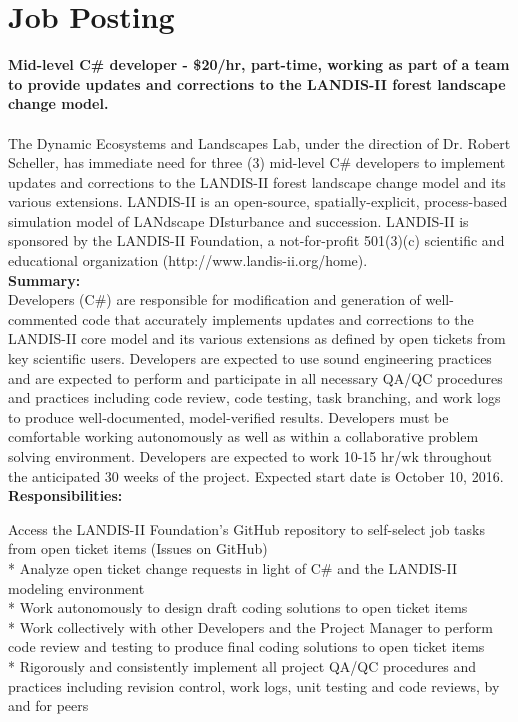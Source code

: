 \documentclass[letterpaper, 12pt]{article}
\newenvironment{myindentpar}[1]%
   {\begin{list}{}%
       {\setlength{\leftmargin}{#1}}%
           \item[]%
   }
     {\end{list}}
\begin{document}
\section{Job Posting}
\vspace*{1cm}
\textbf{Mid-level C\# developer - \$20/hr, part-time, working as part of a team to provide updates and corrections to the LANDIS-II forest landscape change model.} \\
\\
The Dynamic Ecosystems and Landscapes Lab, under the direction of Dr. Robert Scheller, has immediate need for three (3) mid-level C\# developers to implement updates and corrections to the LANDIS-II forest landscape change model and its various extensions. LANDIS-II is an open-source, spatially-explicit, process-based simulation model of LANdscape DIsturbance and succession. LANDIS-II is sponsored by the LANDIS-II Foundation, a not-for-profit 501(3)(c) scientific and educational organization (http://www.landis-ii.org/home). \\

\textbf{Summary:}\\

Developers (C\#) are responsible for modification and generation of well-commented code that accurately implements updates and corrections to the LANDIS-II core model and its various extensions as defined by open tickets from key scientific users.  Developers are expected to use sound engineering practices and are expected to perform and participate in all necessary QA/QC procedures and practices including code review, code testing, task branching, and work logs to produce well-documented, model-verified results. Developers must be comfortable working autonomously as well as within a collaborative problem solving environment. Developers are expected to work 10-15 hr/wk throughout the anticipated 30 weeks of the project. Expected start date is October 10, 2016.\\

\textbf{Responsibilities:}
\begin{myindentpar}{1em}
* Access the LANDIS-II Foundation's GitHub repository to self-select job tasks from open ticket items (Issues on GitHub)\\
* Analyze open ticket change requests in light of C\# and the LANDIS-II modeling environment\\
* Work autonomously to design draft coding solutions to open ticket items\\
* Work collectively with other Developers and the Project Manager to perform code review and testing to produce final coding solutions to open ticket items\\
* Rigorously and consistently implement all project QA/QC procedures and practices including revision control, work logs, unit testing and code reviews, by and for peers
\end{myindentpar}
\end{document}
